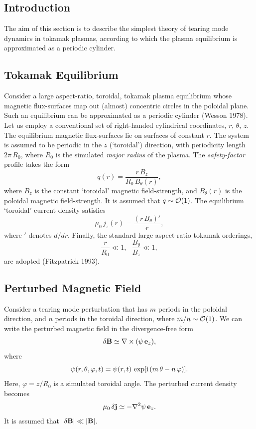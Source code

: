 \documentclass[notitlepage,12pt]{article}
\begin{document}
\subsection{Introduction}
The aim of this section is to describe the simplest theory of tearing mode dynamics in tokamak plasmas, according to which the plasma
equilibrium is approximated as a periodic cylinder. 

\subsection{Tokamak Equilibrium}
Consider a large aspect-ratio, toroidal,  tokamak plasma equilibrium whose magnetic flux-surfaces map out (almost) concentric circles in the poloidal plane. Such an equilibrium can be approximated as a periodic cylinder (Wesson 1978). 
Let us employ a conventional set of right-handed cylindrical coordinates, $r$, $\theta$, $z$. The
equilibrium magnetic flux-surfaces lie on surfaces of constant $r$. The system is
assumed to be periodic in the $z$ (`toroidal') direction, with periodicity length $2\pi\,R_0$, 
where $R_0$ is the simulated {\em major radius}\/ of the plasma. The {\em safety-factor}\/ profile takes the form
\begin{equation}\label{e90}
q(r)= \frac{r\,B_z}{R_0\,B_\theta(r)},
\end{equation}
where $B_z$ is the constant `toroidal' magnetic field-strength, and $B_\theta(r)$ is
the poloidal magnetic field-strength. It is assumed that $q\sim{\cal O}(1)$. 
The equilibrium `toroidal' current density
satisfies
\begin{equation}
\mu_0\,j_z(r) = \frac{(r\,B_\theta)'}{r},
\end{equation}
where $'$ denotes $d/dr$. Finally, the standard large aspect-ratio
tokamak orderings,  
\begin{equation}\label{e92}
\frac{r}{R_0}\ll 1,~~~ \frac{B_\theta}{B_z}\ll 1,
\end{equation}
are adopted (Fitzpatrick 1993). 

\subsection{Perturbed Magnetic Field}
Consider a tearing mode perturbation that has $m$ periods in the poloidal direction,
and $n$ periods in the toroidal direction, where $m/n\sim {\cal O}(1)$.  We can write the perturbed magnetic field in the divergence-free form
\begin{equation}\label{e93}
\delta{\bf B} \simeq \nabla\times (\psi\,{\bf e}_z),
\end{equation}
where
\begin{equation}\label{e93a}
\psi(r,\theta,\varphi,t)= \psi(r,t)\,\exp[{\rm i}\,(m\,\theta-n\,\varphi)].
\end{equation}
Here, $\varphi=z/R_0$ is a simulated toroidal angle. The perturbed current density becomes
\begin{equation}\label{e94}
\mu_0\,\delta {\bf j} \simeq - \nabla^2\psi\,{\bf e}_z.
\end{equation}
It is assumed that $|\delta{\bf B}|\ll |{\bf B}|$. 
\end{document}
